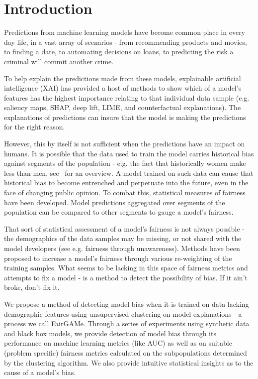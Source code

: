 \documentclass[manuscript,screen,review]{acmart}
\begin{document}
\maketitle

\section{Introduction}
Predictions from machine learning models have become common place in every day life, in a vast array of scenarios - from recommending products and movies, to finding a date, to automating decisions on loans, to predicting the risk a criminal will commit another crime.

To help explain the predictions made from these models, explainable artificial intelligence (XAI) has provided a host of methods to show which of a model's features has the highest importance relating to that individual data sample (e.g. saliency maps, SHAP, deep lift, LIME, and counterfactual explanations).  The explanations of predictions can insure that the model is making the predictions for the right reason.

However, this by itself is not sufficient when the predictions have an impact on humans.  It is possible that the data used to train the model carries historical bias against segments of the population - e.g. the fact that historically women make less than men, see~\citet{dalessandroConscientiousClassificationData2017} for an overview.  A model trained on such data can cause that historical bias to become entrenched and perpetuate into the future, even in the face of changing public opinion.  To combat this, statistical measures of fairness have been developed.  Model predictions aggregated over segments of the population can be compared to other segments to gauge a model's fairness.

That sort of statistical assessment of a model's fairness is not always possible - the demographics of the data samples may be missing, or not shared with the model developers (see e.g. fairness through unawareness).  Methods have been proposed to increase a model's fairness through various re-weighting of the training samples.  What seems to be lacking in this space of fairness metrics and attempts to fix a model - is a method to detect the possibility of bias.  If it ain't broke, don't fix it.

We propose a method of detecting model bias when it is trained on data lacking demographic features using unsupervised clustering on model explanations - a process we call FairGAMe.  Through a series of experiments using synthetic data and black box models, we provide detection of model bias through its performance on machine learning metrics (like AUC) as well as on suitable (problem specific) fairness metrics calculated on the subpopulations determined by the clustering algorithm.  We also provide intuitive statistical insights as to the cause of a model's bias.
\end{document}
